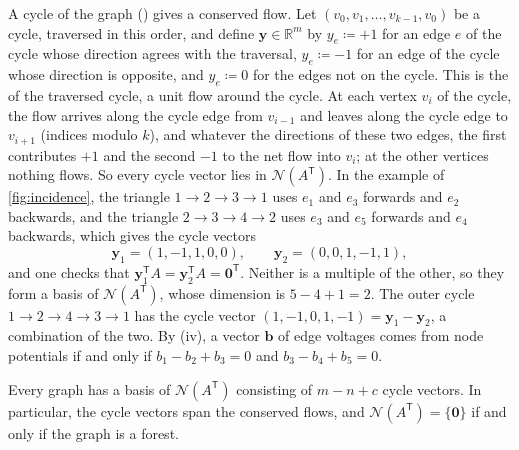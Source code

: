 A cycle of the graph () gives a conserved flow. Let $(v_0,v_1,\ldots,v_{k-1},v_0)$ be a cycle, traversed in this order, and define $\mathbf y\in\mathbb R^m$ by $y_e\coloneqq+1$ for an edge $e$ of the cycle whose direction agrees with the traversal, $y_e\coloneqq-1$ for an edge of the cycle whose direction is opposite, and $y_e\coloneqq0$ for the edges not on the cycle. This is the  of the traversed cycle, a unit flow around the cycle. At each vertex $v_i$ of the cycle, the flow arrives along the cycle edge from $v_{i-1}$ and leaves along the cycle edge to $v_{i+1}$ (indices modulo $k$), and whatever the directions of these two edges, the first contributes $+1$ and the second $-1$ to the net flow into $v_i$; at the other vertices nothing flows. So every cycle vector lies in $\mathcal N(A^{\mathsf T})$. In the example of \cref{fig:incidence}, the triangle $1\to2\to3\to1$ uses $e_1$ and $e_3$ forwards and $e_2$ backwards, and the triangle $2\to3\to4\to2$ uses $e_3$ and $e_5$ forwards and $e_4$ backwards, which gives the cycle vectors
\[
\mathbf y_1=(1,-1,1,0,0),\qquad\mathbf y_2=(0,0,1,-1,1),
\]
and one checks that $\mathbf y_1^{\mathsf T}A=\mathbf y_2^{\mathsf T}A=\mathbf 0^{\mathsf T}$. Neither is a multiple of the other, so they form a basis of $\mathcal N(A^{\mathsf T})$, whose dimension is $5-4+1=2$. The outer cycle $1\to2\to4\to3\to1$ has the cycle vector $(1,-1,0,1,-1)=\mathbf y_1-\mathbf y_2$, a combination of the two. By (iv), a vector $\mathbf b$ of edge voltages comes from node potentials if and only if $b_1-b_2+b_3=0$ and $b_3-b_4+b_5=0$.

\begin{proposition}
\label{prop:cycle-basis}
Every graph has a basis of $\mathcal N(A^{\mathsf T})$ consisting of $m-n+c$ cycle vectors. In particular, the cycle vectors span the conserved flows, and $\mathcal N(A^{\mathsf T})=\{\mathbf 0\}$ if and only if the graph is a forest.
\end{proposition}

